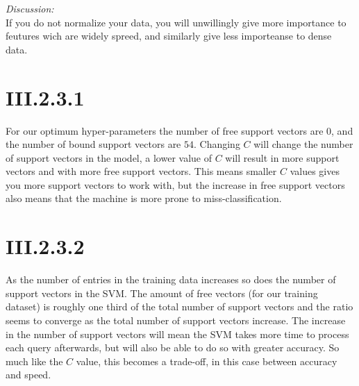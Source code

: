 \noindent \textit{Discussion:}\\
If you do not normalize your data, you will unwillingly give more importance to
feutures wich are widely spreed, and similarly give less importeanse to dense
data.

\section*{III.2.3.1}
For our optimum hyper-parameters the number of free support vectors are $0$, and
the number of bound support vectors are $54$. Changing $C$ will change the
number of support vectors in the model, a lower value of $C$ will result in more
support vectors and with more free support vectors. This means smaller $C$
values gives you more support vectors to work with, but the increase in free
support vectors also means that the machine is more prone to
miss-classification.

\section*{III.2.3.2}
As the number of entries in the training data increases so does the number of
support vectors in the SVM. The amount of free vectors (for our training
dataset) is roughly one third of the total number of support vectors and the
ratio seems to converge as the total number of support vectors increase. The
increase in the number of support vectors will mean the SVM takes more time to
process each query afterwards, but will also be able to do so with greater
accuracy. So much like the $C$ value, this becomes a trade-off, in this case
between accuracy and speed.
